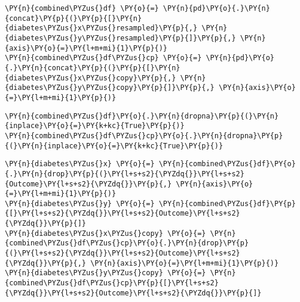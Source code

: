     \begin{tcolorbox}[breakable, size=fbox, boxrule=1pt, pad at break*=1mm,colback=cellbackground, colframe=cellborder]
\begin{Verbatim}[commandchars=\\\{\}]
\PY{n}{combined\PYZus{}df} \PY{o}{=} \PY{n}{pd}\PY{o}{.}\PY{n}{concat}\PY{p}{(}\PY{p}{[}\PY{n}{diabetes\PYZus{}x\PYZus{}resampled}\PY{p}{,} \PY{n}{diabetes\PYZus{}y\PYZus{}resampled}\PY{p}{]}\PY{p}{,} \PY{n}{axis}\PY{o}{=}\PY{l+m+mi}{1}\PY{p}{)}
\PY{n}{combined\PYZus{}df\PYZus{}cp} \PY{o}{=} \PY{n}{pd}\PY{o}{.}\PY{n}{concat}\PY{p}{(}\PY{p}{[}\PY{n}{diabetes\PYZus{}x\PYZus{}copy}\PY{p}{,} \PY{n}{diabetes\PYZus{}y\PYZus{}copy}\PY{p}{]}\PY{p}{,} \PY{n}{axis}\PY{o}{=}\PY{l+m+mi}{1}\PY{p}{)}
\end{Verbatim}
\end{tcolorbox}

    \begin{tcolorbox}[breakable, size=fbox, boxrule=1pt, pad at break*=1mm,colback=cellbackground, colframe=cellborder]
\begin{Verbatim}[commandchars=\\\{\}]
\PY{n}{combined\PYZus{}df}\PY{o}{.}\PY{n}{dropna}\PY{p}{(}\PY{n}{inplace}\PY{o}{=}\PY{k+kc}{True}\PY{p}{)}
\PY{n}{combined\PYZus{}df\PYZus{}cp}\PY{o}{.}\PY{n}{dropna}\PY{p}{(}\PY{n}{inplace}\PY{o}{=}\PY{k+kc}{True}\PY{p}{)}
\end{Verbatim}
\end{tcolorbox}

    \begin{tcolorbox}[breakable, size=fbox, boxrule=1pt, pad at break*=1mm,colback=cellbackground, colframe=cellborder]
\begin{Verbatim}[commandchars=\\\{\}]
\PY{n}{diabetes\PYZus{}x} \PY{o}{=} \PY{n}{combined\PYZus{}df}\PY{o}{.}\PY{n}{drop}\PY{p}{(}\PY{l+s+s2}{\PYZdq{}}\PY{l+s+s2}{Outcome}\PY{l+s+s2}{\PYZdq{}}\PY{p}{,} \PY{n}{axis}\PY{o}{=}\PY{l+m+mi}{1}\PY{p}{)}
\PY{n}{diabetes\PYZus{}y} \PY{o}{=} \PY{n}{combined\PYZus{}df}\PY{p}{[}\PY{l+s+s2}{\PYZdq{}}\PY{l+s+s2}{Outcome}\PY{l+s+s2}{\PYZdq{}}\PY{p}{]}
\PY{n}{diabetes\PYZus{}x\PYZus{}copy} \PY{o}{=} \PY{n}{combined\PYZus{}df\PYZus{}cp}\PY{o}{.}\PY{n}{drop}\PY{p}{(}\PY{l+s+s2}{\PYZdq{}}\PY{l+s+s2}{Outcome}\PY{l+s+s2}{\PYZdq{}}\PY{p}{,} \PY{n}{axis}\PY{o}{=}\PY{l+m+mi}{1}\PY{p}{)}
\PY{n}{diabetes\PYZus{}y\PYZus{}copy} \PY{o}{=} \PY{n}{combined\PYZus{}df\PYZus{}cp}\PY{p}{[}\PY{l+s+s2}{\PYZdq{}}\PY{l+s+s2}{Outcome}\PY{l+s+s2}{\PYZdq{}}\PY{p}{]}
\end{Verbatim}
\end{tcolorbox}


